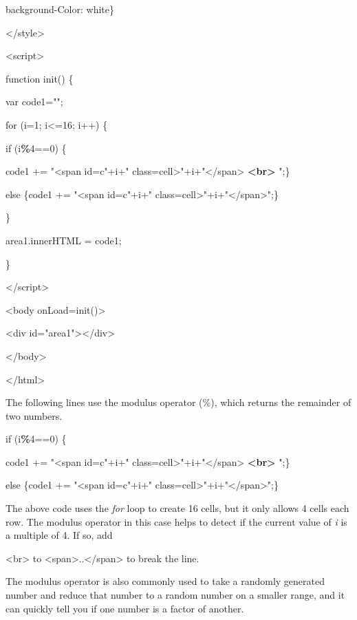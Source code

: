\documentclass[
]{article}
\begin{document}
background-Color: white\}

\textless/style\textgreater{}

\textless script\textgreater{}

function init() \{

var code1="";

for (i=1; i\textless=16; i++) \{

if (i\textbf{\%}4==0) \{

code1 += "\textless span id=c"+i+"
class=\textquotesingle cell\textquotesingle\textgreater"+i+"\textless/span\textgreater{}
\textbf{\textless br\textgreater{}} ";\}

else \{code1 += "\textless span id=c"+i+"
class=\textquotesingle cell\textquotesingle\textgreater"+i+"\textless/span\textgreater";\}

\}

area1.innerHTML = code1;

\}

\textless/script\textgreater{}

\textless body onLoad=init()\textgreater{}

\textless div id="area1"\textgreater\textless/div\textgreater{}

\textless/body\textgreater{}

\textless/html\textgreater{}

The following lines use the modulus operator (\%), which returns the
remainder of two numbers.

if (i\textbf{\%}4==0) \{

code1 += "\textless span id=c"+i+"
class=\textquotesingle cell\textquotesingle\textgreater"+i+"\textless/span\textgreater{}
\textbf{\textless br\textgreater{}} ";\}

else \{code1 += "\textless span id=c"+i+"
class=\textquotesingle cell\textquotesingle\textgreater"+i+"\textless/span\textgreater";\}

The above code uses the \emph{for} loop to create 16 cells, but it only
allows 4 cells each row. The modulus operator in this case helps to
detect if the current value of \emph{i} is a multiple of 4. If so, add

\textless br\textgreater{} to
\textless span\textgreater..\textless/span\textgreater{} to break the
line.

The modulus operator is also commonly used to take a randomly generated
number and reduce that number to a random number on a smaller range, and
it can quickly tell you if one number is a factor of another.
\end{document}
